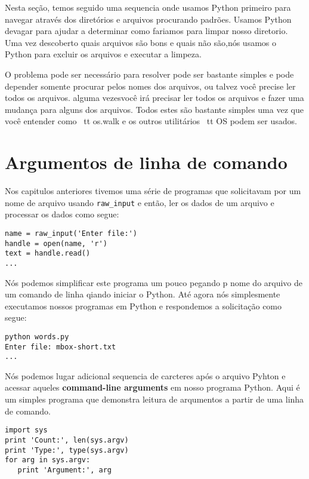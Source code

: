 \documentclass{book}
\begin{document}
Nesta seção, temos seguido uma sequencia onde usamos Python primeiro para navegar através dos diretórios e arquivos
procurando padrões. Usamos Python devagar para ajudar a determinar como fariamos para limpar nosso diretorio.
Uma vez descoberto quais arquivos são bons e quais não são,nós usamos o Python para excluir os arquivos e executar a limpeza.

O problema pode ser necessário para resolver pode ser bastante simples 
e pode depender somente procurar pelos nomes dos arquivos,
ou talvez você precise ler todos os arquivos. alguma vezesvocê irá precisar ler todos os arquivos e fazer uma 
mudança para alguns dos arquivos.
Todos estes são bastante simples uma vez que você entender como {\ tt os.walk}
e os outros utilitários {\ tt OS} podem ser usados.

\section{Argumentos de linha de comando}


Nos capitulos anteriores tivemos uma série de programas que solicitavam
por um nome de arquivo usando \verb"raw_input" e então, ler os dados 
de um arquivo e processar os dados como segue:

\begin{verbatim}
name = raw_input('Enter file:')
handle = open(name, 'r')
text = handle.read()
...
\end{verbatim}

%

Nós podemos simplificar este programa um pouco pegando p nome do arquivo
de um comando de linha qiando iniciar o Python. Até agora 
nós simplesmente executamos nossos programas em Python e respondemos a
solicitação como segue:

\begin{verbatim}
python words.py
Enter file: mbox-short.txt
...
\end{verbatim}

%

Nós podemos lugar adicional sequencia de carcteres após o arquivo Pyhton e acessar aqueles 
{\bf command-line arguments} em nosso programa Python. 
Aqui é um simples programa que demonstra leitura de arqumentos a partir de uma linha de comando.

\begin{verbatim}
import sys
print 'Count:', len(sys.argv)
print 'Type:', type(sys.argv)
for arg in sys.argv:
   print 'Argument:', arg
\end{verbatim}
\end{document}
